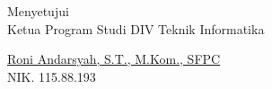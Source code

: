 \vspace{2cm}

\begin{center}
    Menyetujui\\
    Ketua Program Studi DIV Teknik Informatika
    
    \vspace{2.5cm}
    
    \underline{Roni Andarsyah, S.T., M.Kom., SFPC}\\
    NIK. 115.88.193
\end{center}

\vfill

\fancyhfoffset[L]{0cm}
\fancyhfoffset[R]{0cm}
\restoregeometry